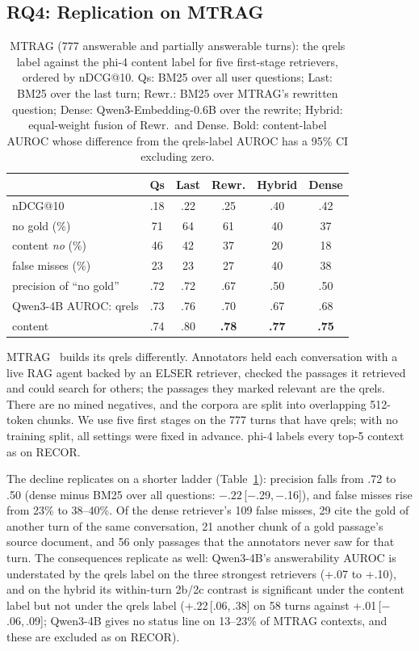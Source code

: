 \documentclass[11pt]{article}
\newcommand{\ci}[2]{\,{\scriptsize[#1,\,#2]}}
\newcommand{\cno}{\textit{no}}
\begin{document}
\subsection{RQ4: Replication on MTRAG}
\label{sec:rq4}

\begin{table}[t]
\centering
\caption{MTRAG (777 answerable and partially answerable turns): the qrels label against the phi-4 content label for five first-stage retrievers, ordered by nDCG@10. Qs: BM25 over all user questions; Last: BM25 over the last turn; Rewr.: BM25 over MTRAG's rewritten question; Dense: Qwen3-Embedding-0.6B over the rewrite; Hybrid: equal-weight fusion of Rewr.\ and Dense. Bold: content-label AUROC whose difference from the qrels-label AUROC has a 95\% CI excluding zero.}
\label{tab:mtrag}
\setlength{\tabcolsep}{5pt}
\begin{tabular}{@{}lccccc@{}}
\toprule
 & Qs & Last & Rewr. & Hybrid & Dense \\
\midrule
nDCG@10 & .18 & .22 & .25 & .40 & .42 \\
no gold (\%) & 71 & 64 & 61 & 40 & 37 \\
content \cno{} (\%) & 46 & 42 & 37 & 20 & 18 \\
false misses (\%) & 23 & 23 & 27 & 40 & 38 \\
precision of ``no gold'' & .72 & .72 & .67 & .50 & .50 \\
\addlinespace[2pt]
Qwen3-4B AUROC: qrels & .73 & .76 & .70 & .67 & .68 \\
\quad content & .74 & .80 & \textbf{.78} & \textbf{.77} & \textbf{.75} \\
\bottomrule
\end{tabular}
\end{table}

MTRAG~\cite{katsis2025mtrag} builds its qrels differently. Annotators held each conversation with a live RAG agent backed by an ELSER retriever, checked the passages it retrieved and could search for others; the passages they marked relevant are the qrels. There are no mined negatives, and the corpora are split into overlapping 512-token chunks. We use five first stages on the 777 turns that have qrels; with no training split, all settings were fixed in advance. phi-4 labels every top-5 context as on RECOR.

The decline replicates on a shorter ladder (Table~\ref{tab:mtrag}): precision falls from .72 to .50 (dense minus BM25 over all questions: $-.22$\ci{$-$.29}{$-$.16}), and false misses rise from 23\% to 38--40\%. Of the dense retriever's 109 false misses, 29 cite the gold of another turn of the same conversation, 21 another chunk of a gold passage's source document, and 56 only passages that the annotators never saw for that turn. The consequences replicate as well: Qwen3-4B's answerability AUROC is understated by the qrels label on the three strongest retrievers (+.07 to +.10), and on the hybrid its within-turn 2b/2c contrast is significant under the content label but not under the qrels label (+.22\ci{.06}{.38} on 58 turns against +.01\ci{$-$.06}{.09}; Qwen3-4B gives no status line on 13--23\% of MTRAG contexts, and these are excluded as on RECOR).
\end{document}
